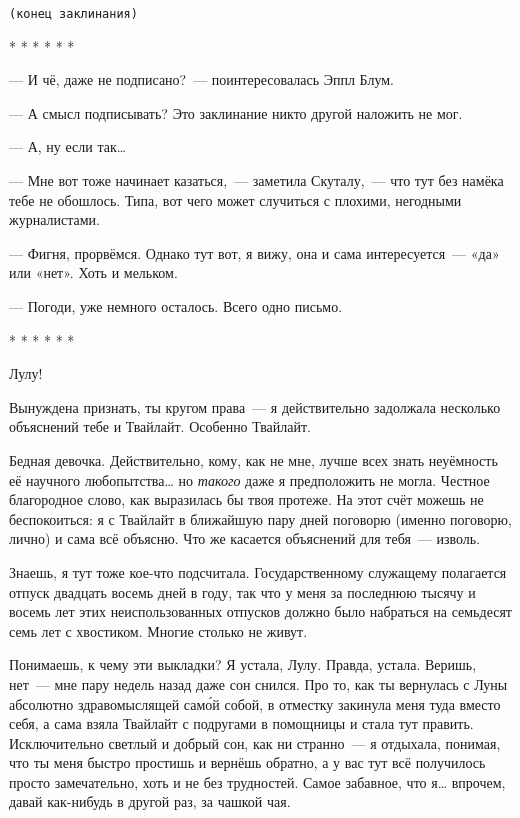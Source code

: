 \documentclass[fontsize=11pt,a5paper,titlepage=firstcover]{scrbook}
\begin{document}
\begin{center}\texttt{(конец заклинания)}\end{center}
\begin{center}* * * * * *\end{center}

--- И чё, даже не подписано?~--- поинтересовалась Эппл Блум.

--- А смысл подписывать? Это заклинание никто другой наложить не мог.

--- А, ну если так{\ldots}

--- Мне вот тоже начинает казаться,~--- заметила Скуталу,~--- что тут без намёка тебе не обошлось. Типа, вот чего может случиться с плохими, негодными журналистами.

--- Фигня, прорвёмся. Однако тут вот, я вижу, она и сама интересуется~--- «да» или «нет». Хоть и мельком.

--- Погоди, уже немного осталось. Всего одно письмо.
\vspace{2mm}
\begin{center}
	* * * * * *
\end{center}

Лулу!

Вынуждена признать, ты кругом права~--- я действительно задолжала несколько объяснений тебе и Твайлайт. Особенно Твайлайт.

Бедная девочка. Действительно, кому, как не мне, лучше всех знать неуёмность её научного любопытства{\ldots} но \emph{такого} даже я предположить не могла. Честное благородное слово, как выразилась бы твоя протеже. На этот счёт можешь не беспокоиться: я с Твайлайт в ближайшую пару дней поговорю (именно поговорю, лично) и сама всё объясню. Что же касается объяснений для тебя~--- изволь.

Знаешь, я тут тоже кое-что подсчитала. Государственному служащему полагается отпуск двадцать восемь дней в году, так что у меня за последнюю тысячу и восемь лет этих неиспользованных отпусков должно было набраться на семьдесят семь лет с хвостиком. Многие столько не живут.

Понимаешь, к чему эти выкладки? Я устала, Лулу. Правда, устала. Веришь, нет~--- мне пару недель назад даже сон снился. Про то, как ты вернулась с Луны абсолютно здравомыслящей само́й собой, в отместку закинула меня туда вместо себя, а сама взяла Твайлайт с подругами в помощницы и стала тут править. Исключительно светлый и добрый сон, как ни странно~--- я отдыхала, понимая, что ты меня быстро простишь и вернёшь обратно, а у вас тут всё получилось просто замечательно, хоть и не без трудностей. Самое забавное, что я{\ldots} впрочем, давай как-нибудь в другой раз, за чашкой чая.
\end{document}
